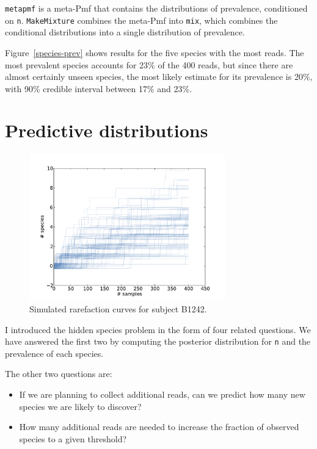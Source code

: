 \documentclass[12pt]{book}
\theoremstyle{exercise}
\begin{document}
{\tt metapmf} is a meta-Pmf that contains the distributions
of prevalence, conditioned on {\tt n}.  {\tt MakeMixture}
combines the meta-Pmf into {\tt mix}, which combines the
conditional distributions into a single distribution
of prevalence.

Figure~\ref{species-prev} shows results for the five
species with the most reads.  The most prevalent species accounts for
23\% of the 400 reads, but since there are almost certainly unseen
species, the most likely estimate for its prevalence is 20\%,
with 90\% credible interval between 17\% and 23\%.


\section{Predictive distributions}

\begin{figure}
\centerline{\includegraphics[height=2.5in]{figs/species-rare-B1242.pdf}}
\caption{Simulated rarefaction curves for subject B1242.}
\label{species-rare}
\end{figure}

I introduced the hidden species problem in the form of four related
questions.  We have answered the first two by computing the posterior
distribution for {\tt n} and the prevalence of each species.

The other two questions are:

\begin{itemize}

\item If we are planning to collect additional reads, can we predict
  how many new species we are likely to discover?

\item How many additional reads are needed to increase the
  fraction of observed species to a given threshold?

\end{itemize}
\end{document}
